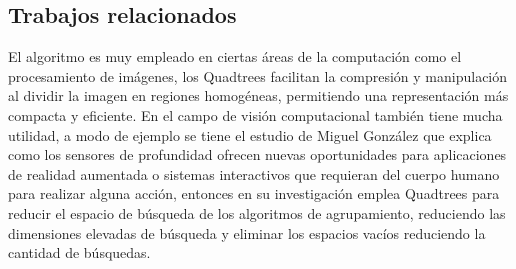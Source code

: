 \documentclass[9pt,a4paper,twoside]{rho-class/rho}
\begin{document}
        \subsection{Trabajos relacionados}
            El algoritmo es muy empleado en ciertas áreas de la computación como el procesamiento de imágenes, los Quadtrees facilitan la compresión y manipulación al dividir la imagen en regiones homogéneas, permitiendo una representación más compacta y eficiente. En el campo de visión computacional también tiene mucha utilidad, a modo de ejemplo se tiene el estudio de Miguel González que explica como los sensores de profundidad ofrecen nuevas oportunidades para aplicaciones de realidad aumentada o sistemas interactivos que requieran del cuerpo humano para realizar alguna acción, entonces en su investigación emplea Quadtrees para reducir el espacio de búsqueda de los algoritmos de agrupamiento, reduciendo las dimensiones elevadas de búsqueda y eliminar los espacios vacíos reduciendo la cantidad de búsquedas.
\end{document}

